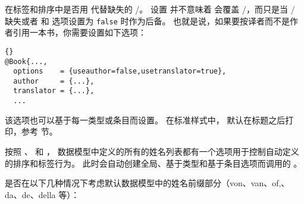 \begin{optionlist}

在标签和排序中是否用  代替缺失的 \slash {}。
设置  并不意味着  会覆盖 \slash {}，而只是当 \slash {} 缺失或者   和  选项设置为 \texttt{false} 时作为后备。
也就是说，如果要按译者而不是作者引用一本书，你需要设置如下选项：

\begin{lstlisting}[style=bibtex]{}
@Book{...,
  options    = {useauthor=false,usetranslator=true},
  author     = {...},
  translator = {...},
  ...
\end{lstlisting}
%
该选项也可以基于每一类型或条目而设置。
在标准样式中， 默认在标题之后打印，参考  节。



按照 、 和 ，
数据模型中定义的所有的姓名列表都有一个选项用于控制自动定义的排序和标签行为。
此时会自动创建全局、基于类型和基于条目选项而调用的 。



是否在以下几种情况下考虑默认数据模型中的姓名前缀部分（von、van、of,、da、de、della 等）：


\end{optionlist}
